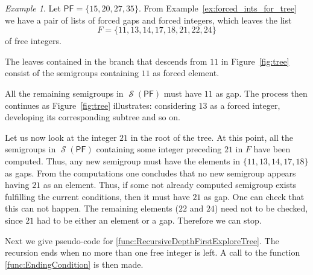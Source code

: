 \documentclass[11pt]{amsart}
\theoremstyle{remark}
\newtheorem{example}[theorem]{Example}
\begin{document}
\begin{example}\label{ex:tree}
Let ${\ensuremath{\mathsf{PF}}} = \{15, 20, 27, 35\}$. From Example~\ref{ex:forced_ints_for_tree} we have a pair of lists of forced gaps and forced integers, which leaves the list 
\begin{equation}\label{eq:free_list}
F=\{11, 13, 14, 17, 18, 21, 22, 24\}
\end{equation} 
of free integers.

The leaves contained in the branch that descends from $11$ in Figure~\ref{fig:tree} consist of the semigroups containing $11$ as forced element.

All the remaining semigroups in $\operatorname{\mathcal{S}}({\ensuremath{\mathsf{PF}}})$ must have $11$ as gap. The process then  continues as Figure~\ref{fig:tree} illustrates: considering $13$ as a forced integer, developing its corresponding subtree and so on.

Let us now look at the integer $21$ in the root of the tree. At this point, all the semigroups in $\operatorname{\mathcal{S}}({\ensuremath{\mathsf{PF}}})$ containing some integer preceding $21$ in $F$ have been computed. Thus, any new semigroup must have the elements in $\{11, 13, 14, 17, 18\}$ as gaps. From the computations one concludes that no new semigroup appears having $21$ as an element. Thus, if some not already computed semigroup exists fulfilling the current conditions, then it must have $21$ as gap. One can check that this can not happen. The remaining elements ($22$ and $24$) need not to be checked, since $21$ had to be either an element or a gap. Therefore we can stop.
\end{example}

Next we give pseudo-code for \ref{func:RecursiveDepthFirstExploreTree}. The recursion ends when no more than one free integer is left. A call to the function \ref{func:EndingCondition} is then made.
\end{document}
